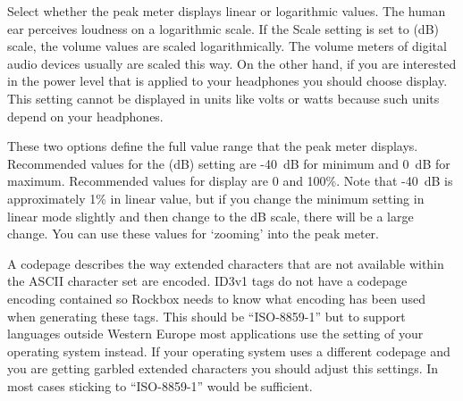 \begin{description}
{\begin{description}
        Select whether the peak meter displays linear or logarithmic values.
        The human ear perceives loudness on a logarithmic scale. If the Scale
        setting is set to  (dB) scale, the volume values
        are scaled logarithmically. The volume meters of digital audio
        devices usually are scaled this way. On the other hand, if you
        are interested in the power level that is applied to your headphones
        you should choose  display. This setting cannot be
        displayed in units like volts or watts because such units depend
        on your headphones.
      \item[Minimum and maximum range.]
        These two options define the full value range that the peak meter
        displays. Recommended values for the  (dB) setting
        are {}-40~dB for minimum and 0~dB for maximum. Recommended values
        for  display are 0 and 100\%. Note that {}-40~dB is
        approximately 1\% in linear value, but if you change the minimum
        setting in linear mode slightly and then change to the dB scale,
        there will be a large change. You can use these values for `zooming'
        into the peak meter.
      \end{description}
    }
    \item[\label{ref:Defaultcodepage}Default Codepage.]
      A codepage describes the way extended characters that are not available
      within the ASCII character set are encoded. ID3v1 tags do not have a
      codepage encoding contained so Rockbox needs to know what encoding has
      been used when generating these tags. This should be ``ISO-8859-1'' but
      to support languages outside Western Europe most applications use
      the setting of your operating system instead. If your operating system
      uses a different codepage and you are getting garbled extended characters
      you should adjust this settings. In most cases sticking to
      ``ISO-8859-1'' would be sufficient.
  \end{description}
